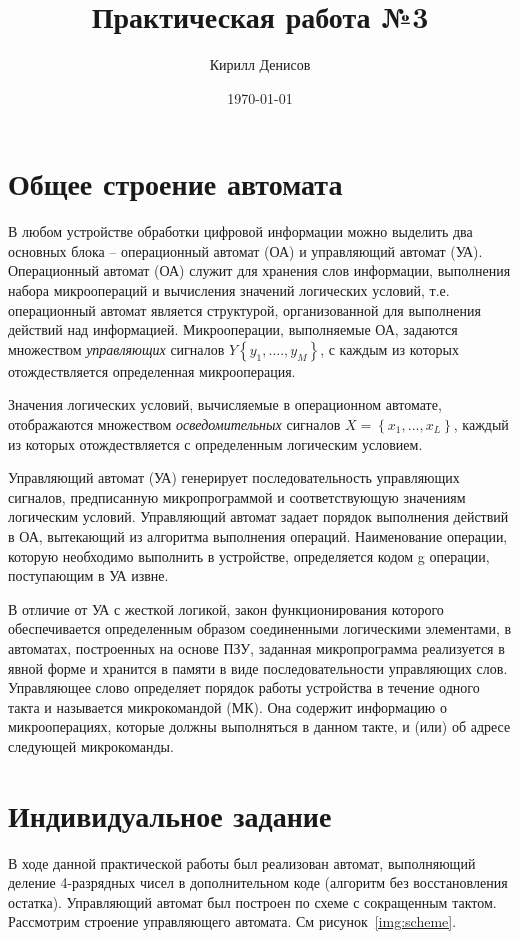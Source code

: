 \documentclass[a4paper,14pt]{extarticle}
\author{Кирилл Денисов}
\title{Практическая работа №3}
\date{\today}
\newcommand{\pathToCommonFolder}{../../Common}
\begin{document}
	\thispagestyle{empty}
	
	
	
	\newpage
	\tableofcontents
	\newpage
	
\section{Общее строение автомата}
В любом устройстве обработки цифровой информации можно выделить два основных блока – операционный автомат (ОА) и управляющий автомат (УА). Операционный автомат (ОА) служит для хранения слов информации, выполнения набора микроопераций и вычисления значений логических условий, т.е. операционный автомат является структурой, организованной для выполнения действий над информацией. Микрооперации, выполняемые ОА, задаются множеством \textit{управляющих} сигналов $Y\left\{y_1,....,y_M\right\}$, с каждым из которых отождествляется определенная микрооперация.

Значения логических условий, вычисляемые в операционном автомате, отображаются множеством \textit{осведомительных} сигналов $X=\left\{x_1,...,x_L\right\}$, каждый из которых отождествляется с определенным логическим условием.

Управляющий автомат (УА) генерирует последовательность управляющих сигналов, предписанную микропрограммой и соответствующую значениям логическим условий. Управляющий автомат задает порядок выполнения действий в ОА, вытекающий из алгоритма выполнения операций. Наименование операции, которую необходимо выполнить в устройстве, определяется кодом g операции, поступающим в УА извне. 

В отличие от УА с жесткой логикой, закон функционирования которого обеспечивается определенным образом соединенными логическими элементами, в автоматах, построенных на основе ПЗУ, заданная микропрограмма реализуется в явной форме и хранится в памяти в виде последовательности управляющих слов. Управляющее слово определяет порядок работы устройства в течение одного такта и называется микрокомандой (МК). Она содержит информацию о микрооперациях, которые должны выполняться в данном такте, и (или) об адресе следующей микрокоманды.
\section{Индивидуальное задание}
В ходе данной практической работы был реализован автомат, выполняющий деление 4-разрядных чисел в дополнительном коде (алгоритм без восстановления остатка). Управляющий автомат был построен по схеме с сокращенным тактом. Рассмотрим строение управляющего автомата. См рисунок~\ref{img:scheme}.
\end{document}

